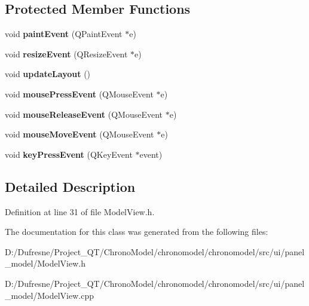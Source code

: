 \subsection*{Protected Member Functions}
\begin{DoxyCompactItemize}
\item 
\hypertarget{class_model_view_a03ba1c73f916ed54050b7e3137edd08f}{void {\bfseries paint\-Event} (Q\-Paint\-Event $\ast$e)}\label{class_model_view_a03ba1c73f916ed54050b7e3137edd08f}

\item 
\hypertarget{class_model_view_a2689038f4eb35614aa0b4a65dd209c18}{void {\bfseries resize\-Event} (Q\-Resize\-Event $\ast$e)}\label{class_model_view_a2689038f4eb35614aa0b4a65dd209c18}

\item 
\hypertarget{class_model_view_aaf0e15469a9d128b4e791e240032fe42}{void {\bfseries update\-Layout} ()}\label{class_model_view_aaf0e15469a9d128b4e791e240032fe42}

\item 
\hypertarget{class_model_view_a1ba62aa68af09fe331cfca96f4ccdc49}{void {\bfseries mouse\-Press\-Event} (Q\-Mouse\-Event $\ast$e)}\label{class_model_view_a1ba62aa68af09fe331cfca96f4ccdc49}

\item 
\hypertarget{class_model_view_ac7027b13c079c050ab0ab7d84cecfd05}{void {\bfseries mouse\-Release\-Event} (Q\-Mouse\-Event $\ast$e)}\label{class_model_view_ac7027b13c079c050ab0ab7d84cecfd05}

\item 
\hypertarget{class_model_view_a5d90b83eddceff89bd5f9e6664242e13}{void {\bfseries mouse\-Move\-Event} (Q\-Mouse\-Event $\ast$e)}\label{class_model_view_a5d90b83eddceff89bd5f9e6664242e13}

\item 
\hypertarget{class_model_view_a7233c0e0315fd66c62f76e1ae3d009aa}{void {\bfseries key\-Press\-Event} (Q\-Key\-Event $\ast$event)}\label{class_model_view_a7233c0e0315fd66c62f76e1ae3d009aa}

\end{DoxyCompactItemize}


\subsection{Detailed Description}


Definition at line 31 of file Model\-View.\-h.



The documentation for this class was generated from the following files\-:\begin{DoxyCompactItemize}
\item 
D\-:/\-Dufresne/\-Project\-\_\-\-Q\-T/\-Chrono\-Model/chronomodel/chronomodel/src/ui/panel\-\_\-model/Model\-View.\-h\item 
D\-:/\-Dufresne/\-Project\-\_\-\-Q\-T/\-Chrono\-Model/chronomodel/chronomodel/src/ui/panel\-\_\-model/Model\-View.\-cpp\end{DoxyCompactItemize}
